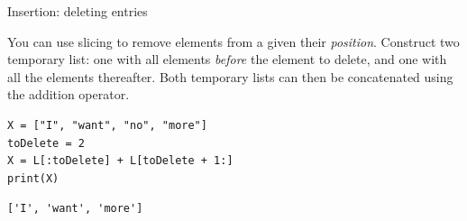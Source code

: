 
\begin{frame}[fragile]{Insertion: deleting entries}
%
\begin{hintbox}
You can use slicing to remove elements from a  given their \emph{position}. Construct two temporary list: one with all elements \emph{before} the element to delete, and one with all the elements thereafter. Both temporary lists can then be concatenated using the addition operator.
\end{hintbox}
%
\begin{tcbraster}[raster columns=2,
                  raster equal height,
                  nobeforeafter,
                  raster column skip=0.5cm]
\begin{codebox}
\begin{verbatim}
X = ["I", "want", "no", "more"]
toDelete = 2
X = L[:toDelete] + L[toDelete + 1:]
print(X)
\end{verbatim}
\end{codebox}
%
\begin{cmdbox}
\begin{verbatim}
['I', 'want', 'more']
\end{verbatim}
\end{cmdbox}
\end{tcbraster}
%
\end{frame}


